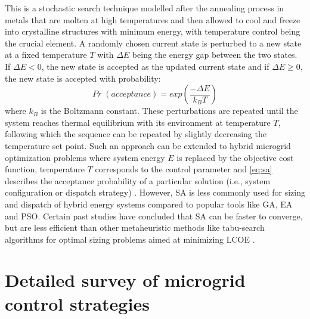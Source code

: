 \documentclass[final,3p,times]{elsarticle}
\begin{document}
This is a stochastic search technique modelled after the annealing process in metals that are molten at high temperatures and then allowed to cool and freeze into crystalline structures with minimum energy, with temperature control being the crucial element. A randomly chosen current state is perturbed to a new state at a fixed temperature $T$ with $\Delta E$ being the energy gap between the two states. If $\Delta E < 0$, the new state is accepted as the updated current state and if $\Delta E \geq 0$, the new state is accepted with probability:
\begin{equation}
\label{eq:sa}
    Pr\;(acceptance) = exp\left(\frac{-\Delta E}{k_BT}\right)
\end{equation}
where $k_B$ is the Boltzmann constant. These perturbations are repeated until the system reaches thermal equilibrium with its environment at temperature $T$, following which the sequence can be repeated by slightly decreasing the temperature set point. Such an approach can be extended to hybrid microgrid optimization problems where system energy $E$ is replaced by the objective cost function, temperature $T$ corresponds to the control parameter and \cref{eq:sa} describes the acceptance probability of a particular solution (i.e., system configuration or dispatch strategy) \cite{fathima2015}. However, SA is less commonly used for sizing and dispatch of hybrid energy systems compared to popular tools like GA, EA and PSO. Certain past studies have concluded that SA can be faster to converge, but are less efficient than other metaheuristic methods like tabu-search algorithms for optimal sizing problems aimed at minimizing LCOE \cite{sa_tabu}.


\section{Detailed survey of microgrid control strategies \label{app:control}}
\end{document}
